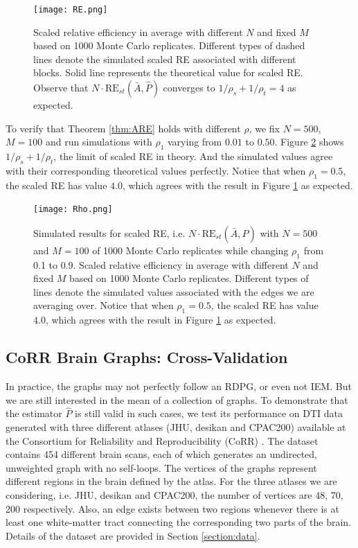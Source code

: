 \documentclass[a4paper]{article}
\begin{document}
\begin{figure}[!htb]
	\centering
	\texttt{[image: RE.png]}
	\caption{Scaled relative efficiency in average with different $N$ and fixed $M$ based on 1000 Monte Carlo replicates. Different types of dashed lines denote the simulated scaled RE associated with different blocks. Solid line represents the theoretical value for scaled RE. Observe that $N \cdot \mathrm{RE}_{st}(\bar{A}, \hat{P})$ converges to $1/\rho_s + 1/\rho_t = 4$ as expected.}
	\label{fig:RE}
\end{figure}

To verify that Theorem \ref{thm:ARE} holds with different $\rho$, we fix $N=500$, $M=100$ and run simulations with $\rho_1$ varying from $0.01$ to $0.50$. Figure \ref{fig:RErho} shows $1/\rho_s + 1/\rho_t$, the limit of scaled RE in theory. And the simulated values agree with their corresponding theoretical values perfectly. Notice that when $\rho_1 = 0.5$, the scaled RE has value $4.0$, which agrees with the result in Figure \ref{fig:RE} as expected.

\begin{figure}[!htb]
\centering
\texttt{[image: Rho.png]}
\caption{Simulated results for scaled RE, i.e. $N \cdot \mathrm{RE}_{st}(\bar{A}, \hat{P})$ with $N = 500$ and $M = 100$ of 1000 Monte Carlo replicates while changing $\rho_1$ from 0.1 to 0.9. Scaled relative efficiency in average with different $N$ and fixed $M$ based on 1000 Monte Carlo replicates. Different types of lines denote the simulated values associated with the edges we are averaging over. Notice that when $\rho_1 = 0.5$, the scaled RE has value $4.0$, which agrees with the result in Figure \ref{fig:RE} as expected.}
\label{fig:RErho}
\end{figure}

\subsection{CoRR Brain Graphs: Cross-Validation}

In practice, the graphs may not perfectly follow an RDPG, or even not IEM. But we are still interested in the mean of a collection of graphs. To demonstrate that the estimator $\hat{P}$ is still valid in such cases, we test its performance on DTI data generated with three different atlases (JHU, desikan and CPAC200) available at the Consortium for Reliability and Reproducibility (CoRR) \cite{zuo2014open, gorgolewski2015high}. The dataset contains 454 different brain scans, each of which generates an undirected, unweighted graph with no self-loops. The vertices of the graphs represent different regions in the brain defined by the atlas. For the three atlases we are considering, i.e. JHU, desikan and CPAC200, the number of vertices are 48, 70, 200 respectively. Also, an edge exists between two regions whenever there is at least one white-matter tract connecting the corresponding two parts of the brain. Details of the dataset are provided in Section \ref{section:data}.
\end{document}
